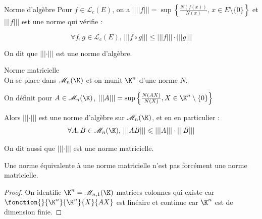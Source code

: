 \begin{proposition}{Norme d'algèbre}{}
    Pour $f \in \mathscr L_c(E)$, on a $||||f||| = \sup \left\{ \frac{N(f(x))}{N(x)}, \, x \in E \setminus \{0\} \right\}$
    et $|||f|||$ est une norme qui vérifie : 

    $$\forall f, g \in \mathscr L_c(E), \, |||f \circ g||| \leqslant |||f||| \cdot |||g|||$$

    On dit que $|||\cdot|||$ est une norme d'algèbre. 
\end{proposition}

\begin{proposition}{Norme matricielle}{}
    \\On se place dans $\mathscr M_n(\K)$ et on munit $\K^n$ d'une norme $N$.

    On définit pour $A \in \mathscr M_n(\K)$, $|||A||| = \sup \left\{ \frac{N(AX)}{N(X)}, X \in \K^n \setminus \{0\} \right\}$
    
    Alors $|||\cdot|||$ est une norme d'algèbre sur $\mathscr M_n(\K)$, et en en particulier : 
    $$\forall A, B \in \mathscr M_n(\K), \, |||AB||| \leqslant |||A||| \cdot |||B|||$$

    On dit aussi que $|||\cdot|||$ est une norme matricielle. 
\end{proposition}

\begin{remarque}
    Une norme équivalente à une norme matricielle n'est pas forcément une norme matricielle.
\end{remarque}

\begin{proof}
    On identifie $\K^n = \mathscr M_{n, 1}(\K)$ matrices colonnes qui existe 
    car $\fonction{}{\K^n}{\K^n}{X}{AX}$ est linéaire et continue car $\K^n$ est de dimension finie. 
    
\end{proof}



